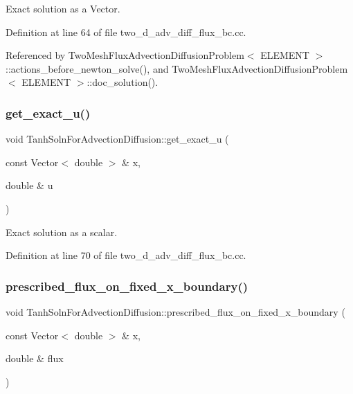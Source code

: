 Exact solution as a Vector. 



Definition at line 64 of file two\+\_\+d\+\_\+adv\+\_\+diff\+\_\+flux\+\_\+bc.\+cc.



Referenced by Two\+Mesh\+Flux\+Advection\+Diffusion\+Problem$<$ E\+L\+E\+M\+E\+N\+T $>$\+::actions\+\_\+before\+\_\+newton\+\_\+solve(), and Two\+Mesh\+Flux\+Advection\+Diffusion\+Problem$<$ E\+L\+E\+M\+E\+N\+T $>$\+::doc\+\_\+solution().

\mbox{\label{namespaceTanhSolnForAdvectionDiffusion_af302dc41c1e494b3430fe6654bd1fd39}} 
\subsubsection{\texorpdfstring{get\+\_\+exact\+\_\+u()}{get\_exact\_u()}\hspace{0.1cm}{\footnotesize\ttfamily [2/2]}}
{\footnotesize\ttfamily void Tanh\+Soln\+For\+Advection\+Diffusion\+::get\+\_\+exact\+\_\+u (\begin{DoxyParamCaption}\item[{const Vector$<$ double $>$ \&}]{x,  }\item[{double \&}]{u }\end{DoxyParamCaption})}



Exact solution as a scalar. 



Definition at line 70 of file two\+\_\+d\+\_\+adv\+\_\+diff\+\_\+flux\+\_\+bc.\+cc.

\mbox{\label{namespaceTanhSolnForAdvectionDiffusion_abe08f9a34481f9c6d6d4708f19f4cd41}} 
\subsubsection{\texorpdfstring{prescribed\+\_\+flux\+\_\+on\+\_\+fixed\+\_\+x\+\_\+boundary()}{prescribed\_flux\_on\_fixed\_x\_boundary()}}
{\footnotesize\ttfamily void Tanh\+Soln\+For\+Advection\+Diffusion\+::prescribed\+\_\+flux\+\_\+on\+\_\+fixed\+\_\+x\+\_\+boundary (\begin{DoxyParamCaption}\item[{const Vector$<$ double $>$ \&}]{x,  }\item[{double \&}]{flux }\end{DoxyParamCaption})}



